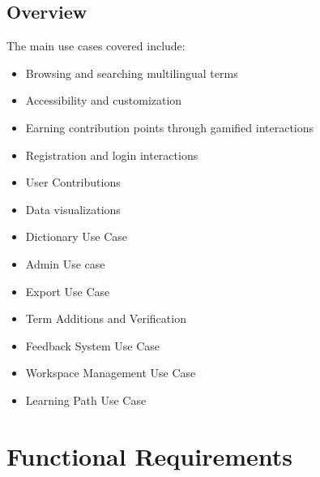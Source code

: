 \documentclass[12pt]{article}
\begin{document}
\subsection{Overview}
The main use cases covered include:
\begin{itemize}
  \item Browsing and searching multilingual terms
  \item Accessibility and customization
  \item Earning contribution points through gamified interactions
  \item Registration and login interactions
  \item User Contributions
  \item Data visualizations
  \item Dictionary Use Case
  \item Admin Use case
  \item Export Use Case
  \item Term Additions and Verification
  \item Feedback System Use Case
  \item Workspace Management Use Case
  \item Learning Path Use Case
\end{itemize}

\section{Functional Requirements}
\end{document}
